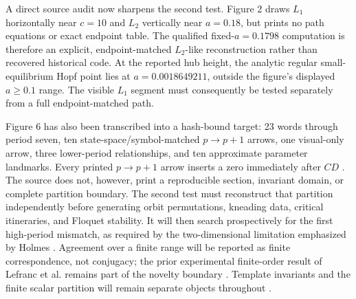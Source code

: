 A direct source audit now sharpens the second test.  Figure 2 draws $L_1$
horizontally near $c=10$ and $L_2$ vertically near $a=0.18$, but prints no path
equations or exact endpoint table.  The qualified fixed-$a=0.1798$ computation
is therefore an explicit, endpoint-matched $L_2$-like reconstruction rather
than recovered historical code.  At the reported hub height, the analytic regular
small-equilibrium Hopf point lies at $a=0.0018649211$, outside the figure's
displayed $a\geq0.1$ range.  The visible $L_1$ segment must consequently be
tested separately from a full endpoint-matched path.

Figure 6 has also been transcribed into a hash-bound target: 23 words through
period seven, ten state-space/symbol-matched $p\mathbin{\to}p+1$ arrows, one
visual-only arrow, three lower-period relationships, and ten approximate
parameter landmarks.  Every printed $p\mathbin{\to}p+1$ arrow inserts a zero
immediately after $CD$ \citep{metropolis1973finite}.  The source does not,
however, print a reproducible
section, invariant domain, or complete partition boundary.  The second test
must reconstruct that partition independently before generating orbit
permutations, kneading data, critical itineraries, and Floquet stability.  It
will then search prospectively for the first high-period mismatch, as required
by the two-dimensional limitation emphasized by Holmes
\citep{holmes1984bifurcation}.  Agreement over a finite range will be reported
as finite correspondence, not conjugacy; the prior experimental finite-order
result of Lefranc et al. remains part of the novelty boundary
\citep{lefranc1994combining}.  Template invariants and the finite scalar
partition will remain separate objects throughout \citep{gilmore1998topological}.

